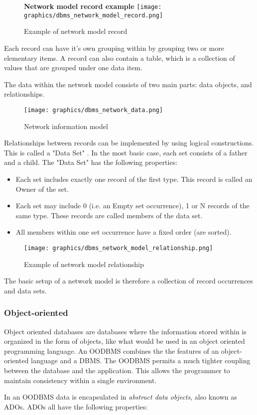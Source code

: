 \documentclass[letterpaper, 12pt]{article}
\begin{document}
\begin{figure}
  \centering
  \textbf{Network model record example}
  \texttt{[image: graphics/dbms\_network\_model\_record.png]}
  \caption{Example of network model record}
  \cite{network_model_coronet}
\end{figure}

Each record can have it's own grouping within by grouping two or more elementary items.
A record can also contain a table, which is a collection of values that are grouped
under one data item.
\par\vspace{\baselineskip}
The data within the network model consists of two main parts: data objects, and
relationships.

\begin{figure}
  \centering
  \texttt{[image: graphics/dbms\_network\_data.png]}
  \caption{Network information model}
  \cite{network_model_coronet}
\end{figure}

Relationships between records can be implemented by using logical constructions.
This is called a "Data Set" . In the most basic case, each set consists of a father
and a child. The "Data Set" has the following properties:

\begin{itemize}
  \item Each set includes exactly one record of the first type. This record is called an Owner of the set.
  \item Each set may include 0 (i.e. an Empty set occurrence), 1 or N records of the same type. These records are called members of the data set.
  \item All members within one set occurrence have a fixed order (are sorted).
\end{itemize}

\begin{figure}
  \centering
  \texttt{[image: graphics/dbms\_network\_model\_relationship.png]}
  \caption{Example of network model relationship}
\end{figure}

The basic setup of a network model is therefore a collection of record occurrences and
data sets.

\subsubsection{Object-oriented}
Object oriented databases are databases where the information stored within is organized
in the form of objects, like what would be used in an object oriented programming
language. An OODBMS combines the the features of an object-oriented language and a
DBMS. The OODBMS permits a much tighter coupling between the database and the application. This allows the programmer to maintain consistency within a single environment.
\par\vspace{\baselineskip}
In an OODBMS data is encapsulated in \textit{abstract data objects}, also known
as ADOs. ADOs all have the following properties:
\end{document}
